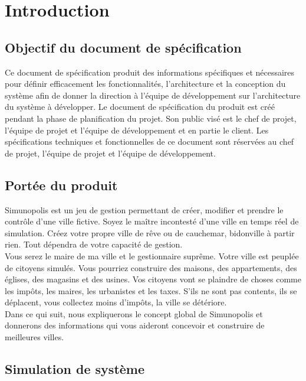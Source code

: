 \section{Introduction}

\subsection{Objectif du document de spécification}

Ce document de spécification produit des informations spécifiques et nécessaires pour définir efficacement les fonctionnalités, l'architecture et la conception du système afin de donner la direction à l'équipe de développement sur l'architecture du système à développer. Le document de spécification du produit est créé pendant la phase de planification du projet. Son public visé est le chef de projet, l'équipe de projet et l'équipe de développement et en partie le client. Les spécifications techniques et fonctionnelles de ce document sont réservées au chef de projet, l'équipe de projet et l'équipe de développement.

\subsection{Portée du produit}

Simunopolis est un jeu de gestion permettant de créer, modifier et prendre le contrôle d’une ville fictive. Soyez le maître incontesté d'une ville en temps réel de simulation. Créez votre propre ville de rêve ou de cauchemar, bidonville à partir rien. Tout dépendra de votre capacité de gestion.\\

Vous serez le maire de ma ville et le gestionnaire suprême. Votre ville est peuplée de citoyens simulés. Vous pourriez construire des maisons, des appartements, des églises, des magasins et des usines. Vos citoyens vont se plaindre de choses comme les impôts, les maires, les urbanistes et les taxes. S'ils ne sont pas contents, ils se déplacent, vous collectez moins d'impôts, la ville se détériore.\\

Dans ce qui suit, nous expliquerons le concept global de Simunopolis et donnerons des informations qui vous aideront concevoir et construire de meilleures villes.\\

\subsection{Simulation de système}

